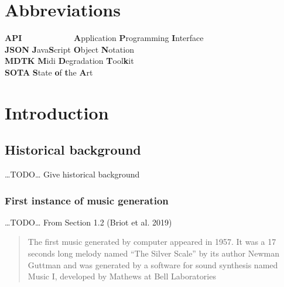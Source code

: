 \documentclass[12pt,a4paper,]{report}
\begin{document}
\newpage


\tableofcontents

\newpage
\listoffigures

\newpage

\listoftables

\newpage

\hypertarget{abbreviations}{%
\chapter*{Abbreviations}\label{abbreviations}}

\begin{tabbing}
\textbf{API}~~~~~~~~~~~~ \= \textbf{A}pplication \textbf{P}rogramming \textbf{I}nterface \\  
\textbf{JSON} \> \textbf{J}ava\textbf{S}cript \textbf{O}bject \textbf{N}otation \\
\textbf{MDTK} \> \textbf{M}idi \textbf{D}egradation \textbf{T}ool\textbf{k}it \\
\textbf{SOTA} \> \textbf{S}tate \textbf{o}f \textbf{t}he \textbf{A}rt \\
\end{tabbing}

\newpage

\hypertarget{introduction}{%
\chapter{Introduction}\label{introduction}}

\hypertarget{historical-background}{%
\section{Historical background}\label{historical-background}}

\ldots TODO\ldots{} Give historical background

\hypertarget{first-instance-of-music-generation}{%
\subsection{First instance of music
generation}\label{first-instance-of-music-generation}}

\ldots TODO\ldots{} From Section 1.2 (Briot et al. 2019)

\begin{quote}
The first music generated by computer appeared in 1957. It was a 17
seconds long melody named ``The Silver Scale'' by its author Newman
Guttman and was generated by a software for sound synthesis named Music
I, developed by Mathews at Bell Laboratories
\end{quote}
\end{document}
